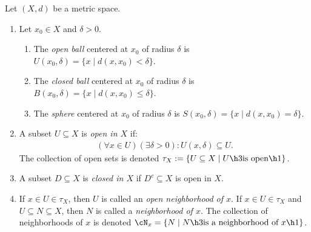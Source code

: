    \begin{definition}
        Let $(X,d)$ be a metric space.
            \begin{enumerate}[label = (\arabic*),itemsep=1pt,topsep=3pt]
                \item Let $x_0 \in X$ and $\delta > 0$.
                    \begin{enumerate}[label = (\roman*),itemsep=1pt,topsep=3pt]
                        \item The \textit{open ball} centered at $x_0$ of radius $\delta$ is $U(x_0,\delta) = \{x \mid d(x,x_0) < \delta \}$.
                        \item The \textit{closed ball} centered at $x_0$ of radius $\delta$ is $B(x_0,\delta) = \{x \mid d(x,x_0) \leq \delta \}$.
                        \item The \textit{sphere} centered at $x_0$ of radius $\delta$ is $S(x_0,\delta) = \{x \mid d(x,x_0) = \delta \}$.
                    \end{enumerate}

                \item A subset $U \subseteq X$ is \textit{open in $X$} if:
                    \begin{equation*}
                    \begin{split}
                        (\forall x \in U)(\exists \delta > 0): U(x,\delta) \subseteq U.
                    \end{split}
                    \end{equation*}
                The collection of open sets is denoted $\tau_X :=\{U \subseteq X \mid U \h3\text{is open}\h1\}$.

                \item A subset $D \subseteq X$ is \textit{closed in $X$} if $D^c \subseteq X$ is open in $X$.
                
                \item If $x \in U \in \tau_X$, then $U$ is called an \textit{open neighborhood of $x$}. If $x \in U \in \tau_X$ and $U \subseteq N \subseteq X$, then $N$ is called a \textit{neighborhood of $x$}. The collection of neighborhoods of $x$ is denoted $\cN_x = \{N \mid N \h3 \text{is a neighborhood of $x$}\h1\}$.
                

\end{enumerate}
\end{definition}
